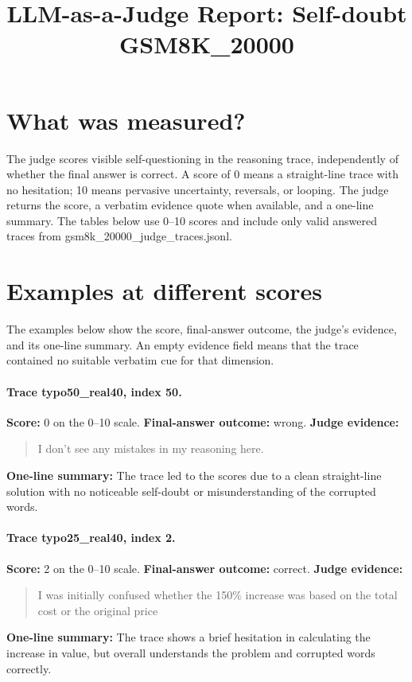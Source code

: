 \documentclass[11pt]{article}
\title{LLM-as-a-Judge Report: Self-doubt\\\large GSM8K\_20000}
\date{}
\begin{document}
\maketitle

\section*{What was measured?} The judge scores visible self-questioning in the reasoning trace, independently of whether the final answer is correct. A score of 0 means a straight-line trace with no hesitation; 10 means pervasive uncertainty, reversals, or looping. The judge returns the score, a verbatim evidence quote when available, and a one-line summary. The tables below use 0--10 scores and include only valid answered traces from gsm8k\_20000\_judge\_traces.jsonl.

\section*{Examples at different scores} The examples below show the score, final-answer outcome, the judge's evidence, and its one-line summary. An empty evidence field means that the trace contained no suitable verbatim cue for that dimension.

\paragraph{Trace typo50\_real40, index 50.}
\textbf{Score:} 0 on the 0--10 scale. \textbf{Final-answer outcome:} wrong.
\textbf{Judge evidence:} \begin{quote}I don't see any mistakes in my reasoning here.\end{quote}
\textbf{One-line summary:} The trace led to the scores due to a clean straight-line solution with no noticeable self-doubt or misunderstanding of the corrupted words.\medskip
\paragraph{Trace typo25\_real40, index 2.}
\textbf{Score:} 2 on the 0--10 scale. \textbf{Final-answer outcome:} correct.
\textbf{Judge evidence:} \begin{quote}I was initially confused whether the 150\% increase was based on the total cost or the original price\end{quote}
\textbf{One-line summary:} The trace shows a brief hesitation in calculating the increase in value, but overall understands the problem and corrupted words correctly.\medskip
\end{document}
